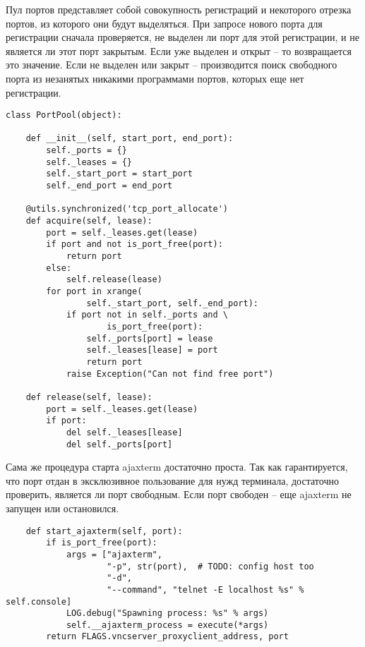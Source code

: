 Пул портов представляет собой совокупность регистраций и некоторого отрезка портов, из которого
они будут выделяться. При запросе нового порта для регистрации сначала проверяется, не 
выделен ли порт для этой регистрации, и не является ли этот порт закрытым. 
Если уже выделен и открыт -- то возвращается это значение. Если
не выделен или закрыт -- производится поиск свободного порта из незанятых никакими 
программами портов, которых еще нет регистрации.
\begin{lstlisting}
class PortPool(object):

    def __init__(self, start_port, end_port):
        self._ports = {}
        self._leases = {}
        self._start_port = start_port
        self._end_port = end_port

    @utils.synchronized('tcp_port_allocate')
    def acquire(self, lease):
        port = self._leases.get(lease)
        if port and not is_port_free(port):
            return port
        else:
            self.release(lease)
        for port in xrange(
                self._start_port, self._end_port):
            if port not in self._ports and \
                    is_port_free(port):
                self._ports[port] = lease
                self._leases[lease] = port
                return port
            raise Exception("Can not find free port")

    def release(self, lease):
        port = self._leases.get(lease)
        if port:
            del self._leases[lease]
            del self._ports[port]
\end{lstlisting}

Сама же процедура старта ajaxterm достаточно проста. Так как гарантируется, что порт
отдан в эксклюзивное пользование для нужд терминала, достаточно проверить, является 
ли порт свободным. Если порт свободен -- еще ajaxterm не запущен или остановился.
\begin{lstlisting}
    def start_ajaxterm(self, port):
        if is_port_free(port):
            args = ["ajaxterm",
                    "-p", str(port),  # TODO: config host too
                    "-d",
                    "--command", "telnet -E localhost %s" % self.console]
            LOG.debug("Spawning process: %s" % args)
            self.__ajaxterm_process = execute(*args)
        return FLAGS.vncserver_proxyclient_address, port
\end{lstlisting}




